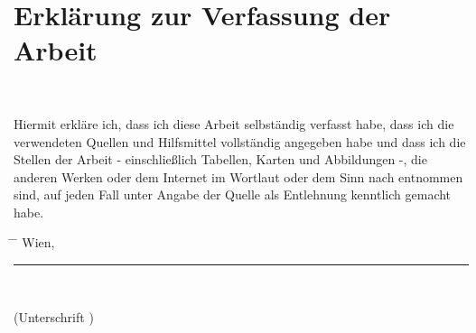 \chapter*{Erklärung zur Verfassung der Arbeit}

\tuinfthesisauthor\\

\vspace*{1.2cm}

Hiermit erkläre ich, dass ich diese Arbeit selbständig verfasst habe, 
dass ich die verwendeten Quellen und Hilfsmittel vollständig angegeben 
habe und dass ich die Stellen der Arbeit - einschließlich Tabellen, 
Karten und Abbildungen -, die anderen Werken oder dem Internet im 
Wortlaut oder dem Sinn nach entnommen sind, auf jeden Fall unter Angabe 
der Quelle als Entlehnung kenntlich gemacht habe.\\



  \begin{tabbing}%
    \hspace{15mm} \= \hspace{65mm} \= \hspace{42mm} \kill
    \> Wien, \tuinfthesisdate \> {\raggedright\rule{51mm}{0.5pt}} \\
    \> \> \begin{minipage}[t][0.5cm][t]{51mm}\centering
 (Unterschrift \tuinfthesisverfassung)\end{minipage}
  \end{tabbing}